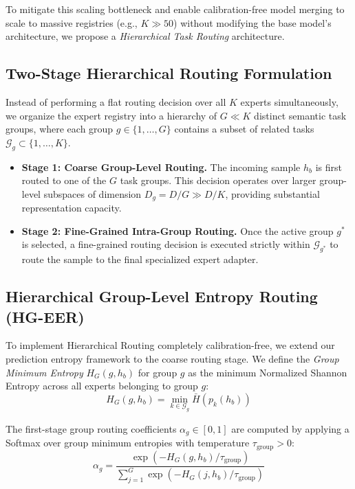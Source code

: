 \documentclass{article}
\theoremstyle{plain}
\theoremstyle{definition}
\theoremstyle{remark}
\begin{document}
To mitigate this scaling bottleneck and enable calibration-free model merging to scale to massive registries (e.g., $K \gg 50$) without modifying the base model's architecture, we propose a \emph{Hierarchical Task Routing} architecture.

\subsection{Two-Stage Hierarchical Routing Formulation}
Instead of performing a flat routing decision over all $K$ experts simultaneously, we organize the expert registry into a hierarchy of $G \ll K$ distinct semantic task groups, where each group $g \in \{1, \dots, G\}$ contains a subset of related tasks $\mathcal{G}_g \subset \{1, \dots, K\}$.
\begin{itemize}
    \item \textbf{Stage 1: Coarse Group-Level Routing.} The incoming sample $h_b$ is first routed to one of the $G$ task groups. This decision operates over larger group-level subspaces of dimension $D_g = D / G \gg D / K$, providing substantial representation capacity.
    \item \textbf{Stage 2: Fine-Grained Intra-Group Routing.} Once the active group $g^*$ is selected, a fine-grained routing decision is executed strictly within $\mathcal{G}_{g^*}$ to route the sample to the final specialized expert adapter.
\end{itemize}

\subsection{Hierarchical Group-Level Entropy Routing (HG-EER)}
To implement Hierarchical Routing completely calibration-free, we extend our prediction entropy framework to the coarse routing stage. We define the \emph{Group Minimum Entropy} $H_G(g, h_b)$ for group $g$ as the minimum Normalized Shannon Entropy across all experts belonging to group $g$:
\begin{equation}
H_G(g, h_b) = \min_{k \in \mathcal{G}_g} \bar{H}(p_k(h_b))
\end{equation}

The first-stage group routing coefficients $\alpha_g \in [0, 1]$ are computed by applying a Softmax over group minimum entropies with temperature $\tau_{\text{group}} > 0$:
\begin{equation}
\alpha_g = \frac{\exp\left(-H_G(g, h_b) / \tau_{\text{group}}\right)}{\sum_{j=1}^G \exp\left(-H_G(j, h_b) / \tau_{\text{group}}\right)}
\end{equation}
\end{document}
